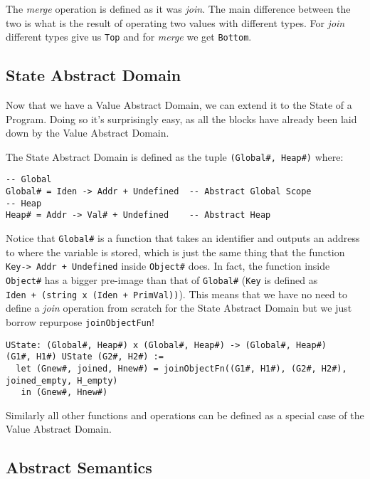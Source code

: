 The \emph{merge} operation is defined as it was \emph{join}. The main
difference between the two is what is the result of operating two values
with different types. For \emph{join} different types give us
\texttt{Top} and for \emph{merge} we get \texttt{Bottom}.

\subsection{State Abstract Domain}\label{state-abstract-domain-1}

Now that we have a Value Abstract Domain, we can extend it to the State
of a Program. Doing so it's surprisingly easy, as all the blocks have
already been laid down by the Value Abstract Domain.

The State Abstract Domain is defined as the tuple
\texttt{(Global\#,\ Heap\#)} where:

\begin{verbatim}
-- Global
Global# = Iden -> Addr + Undefined  -- Abstract Global Scope
-- Heap
Heap# = Addr -> Val# + Undefined    -- Abstract Heap
\end{verbatim}

Notice that \texttt{Global\#} is a function that takes an identifier and
outputs an address to where the variable is stored, which is just the
same thing that the function
\texttt{Key-\textgreater{}\ Addr\ +\ Undefined} inside \texttt{Object\#}
does. In fact, the function inside \texttt{Object\#} has a bigger
pre-image than that of \texttt{Global\#} (\texttt{Key} is defined as
\texttt{Iden\ +\ (string\ x\ (Iden\ +\ PrimVal))}). This means that we
have no need to define a \emph{join} operation from scratch for the
State Abstract Domain but we just borrow repurpose
\texttt{joinObjectFun}!

\begin{verbatim}
UState: (Global#, Heap#) x (Global#, Heap#) -> (Global#, Heap#)
(G1#, H1#) UState (G2#, H2#) :=
  let (Gnew#, joined, Hnew#) = joinObjectFn((G1#, H1#), (G2#, H2#), joined_empty, H_empty)
   in (Gnew#, Hnew#)
\end{verbatim}

Similarly all other functions and operations can be defined as a special
case of the Value Abstract Domain.

\subsection{Abstract Semantics}\label{abstract-semantics-1}

